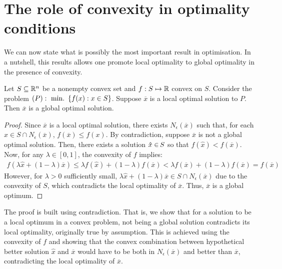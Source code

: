 \section{The role of convexity in optimality conditions}


We can now state what is possibly the most important result in optimisation. In a nutshell, this results allows one promote local optimality to global optimality in the presence of convexity. 

\begin{theorem}\label{thm:convex_global}
Let $S \subseteq \mathbb{R}^n$ be a nonempty convex set and $f:S \mapsto \mathbb{R}$ convex on $S$. Consider the problem $(P):~\mathop{\text{min.~}} \left\{ f(x) : x \in S \right \}$. Suppose $\overline{x}$ is a local optimal solution to $P$. Then $\overline{x}$ is a global optimal solution.
\end{theorem}

\begin{proof}
Since $\overline{x}$ is a local optimal solution, there exists $N_\epsilon(\overline{x})$ such that, for each $x \in S \cap N_\epsilon(\overline{x})$, $f(\overline{x}) \leq f(x)$. By contradiction, suppose $\overline{x}$ is not a global optimal solution. Then, there exists a solution $\hat{x} \in\hspace{-1pt} S$ so that $f(\hat{x}) < f(\overline{x})$. Now, for any $\lambda \in [0,1]$, the convexity of $f$ implies:  
%
\begin{align*}
f(\lambda\hat{x} + (1-\lambda)\overline{x}) \leq \lambda f(\hat{x}) + (1-\lambda)f(\overline{x}) < \lambda f(\overline{x}) + (1-\lambda)f(\overline{x}) = f(\overline{x})
\end{align*}
%
However, for $\lambda > 0$ sufficiently small, $\lambda\hat{x} + (1-\lambda)\overline{x} \in S\cap N_\epsilon(\overline{x})$ due to the convexity of $S$, which contradicts the local optimality of $\overline{x}$. Thus, $\overline{x}$ is a global optimum. 
\end{proof}

The proof is built using contradiction. That is, we show that for a solution to be a local optimum in a convex problem, not being a global solution contradicts its local optimality, originally true by assumption. This is achieved using the convexity of $f$ and showing that the convex combination between hypothetical better solution $\hat{x}$ and $\overline{x}$ would have to be both in $N_\epsilon(\overline{x})$ and better than $\overline{x}$, contradicting the local optimality of $\overline{x}$.


